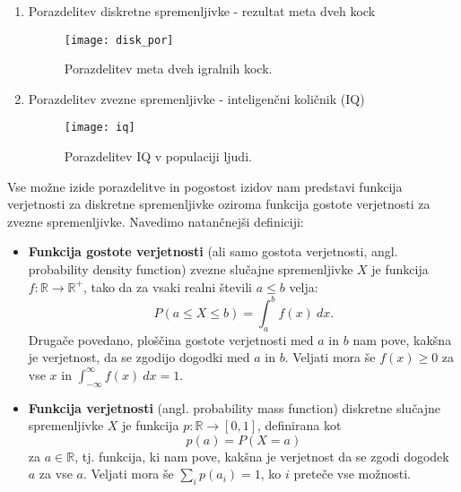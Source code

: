 \begin{zgled}
	\leavevmode
	\begin{enumerate}
		\item Porazdelitev diskretne spremenljivke - rezultat meta dveh kock
		\begin{figure}[!ht]
			\centering
			\texttt{[image: disk\_por]}
			\caption{Porazdelitev meta dveh igralnih kock.}
		\end{figure}
		\item Porazdelitev zvezne spremenljivke - inteligenčni količnik (IQ)
		\begin{figure}[!ht]
			\centering
			\texttt{[image: iq]}
			\caption{Porazdelitev IQ v populaciji ljudi.}
		\end{figure}
	\end{enumerate}
\end{zgled}

Vse možne izide porazdelitve in pogostost izidov nam predstavi funkcija verjetnosti za diskretne spremenljivke oziroma funkcija gostote verjetnosti za zvezne spremenljivke. Navedimo natančnejši definiciji:

\begin{definicija}
	\leavevmode
	\begin{itemize}
		\item \textbf{Funkcija gostote verjetnosti} (ali samo gostota verjetnosti, angl. probability density function) zvezne slučajne spremenljivke $X$ je funkcija $f: \mathbb{R} \rightarrow \mathbb{R^+}$, tako da za vsaki realni števili $a \leq b$ velja:
		\begin{equation}
			P(a \leq X \leq b) = \int_a^b f(x) \ dx.
		\end{equation}
		Drugače povedano, ploščina gostote verjetnosti med $a$ in $b$ nam pove, kakšna je verjetnost, da se zgodijo dogodki med $a$ in $b$. Veljati mora še $f(x) \geq 0$ za vse $x$ in $\int_{-\infty}^\infty f(x) \ dx = 1$.
		\item \textbf{Funkcija verjetnosti} (angl. probability mass function) diskretne slučajne spremenljivke $X$ je funkcija $p: \mathbb{R} \rightarrow [0,1]$, definirana kot
		\begin{equation}
			p(a) = P(X = a)
		\end{equation}
		za $a \in \mathbb{R}$, tj. funkcija, ki nam pove, kakšna je verjetnost da se zgodi dogodek $a$ za vse $a$. Veljati mora še $\sum_i p(a_i) = 1$, ko $i$ preteče vse možnosti.
	\end{itemize}
\end{definicija}

